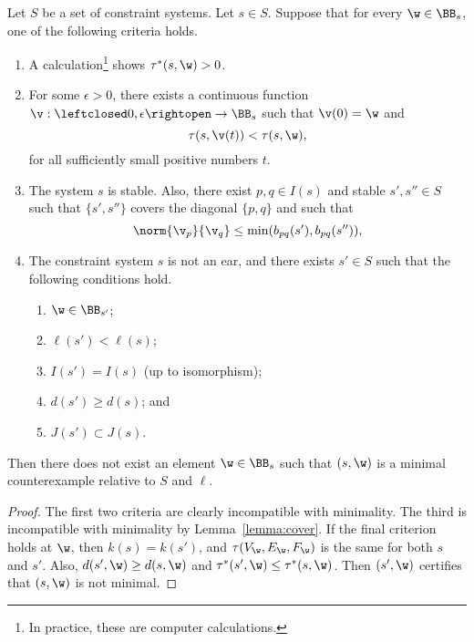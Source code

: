 \begin{lemma}\label{lemma:min-crit} 
Let $S$ be a set of constraint systems.  Let $s\in S$.
Suppose that for every $\w\in\BB_s$, one of the following criteria holds.
\begin{enumerate}
\item {}  A calculation\footnote{In practice, these
  are computer calculations.} shows $\tau^*(s,\w)>0$.
 \item {}  For some $\epsilon>0$, there exists a continuous function 
  $\v:\leftclosed 0,\epsilon\rightopen\to\BB_s$ such that $\v(0)=\w$ and
  \[
  \tau(s,\v(t))<\tau(s,\w),
  \]
  for all sufficiently small positive numbers $t$.
\item {}  The system $s$ is stable.  Also,
there exist $p,q\in I(s)$ and stable $s',s''\in S$ such that
  $\{s',s''\}$ covers the diagonal $\{p,q\}$ and such that
\[
\norm{\v_p}{\v_q}\le \min (b_{pq}(s'),b_{pq}(s'')),
\]
\item {} The constraint system $s$ is not an ear, and
  there exists $s'\in S$ such that the following conditions hold.
  \begin{enumerate}
    \item $\w\in \BB_{s'}$;
    \item $\ell(s')<\ell(s)$;
      \item  $I(s')=I(s)$ (up to isomorphism);
        \item $d(s')\ge d(s)$; and
          \item $J(s')\subset J(s)$.
            \end{enumerate}
\end{enumerate}
Then there does not exist an element $\w\in \BB_s$ such that $(s,\w)$
is a minimal counterexample relative to $S$ and $\ell$.
\end{lemma}
%
%
%

\begin{proof} The first two criteria are clearly incompatible with
  minimality.  The third is incompatible with minimality by
  Lemma~\ref{lemma:cover}.  If the final criterion holds at $\w$, then
  $k(s)=k(s')$, and $\tau(V_\w,E_\w,F_\w)$ is the same for both $s$
  and $s'$.  Also, $d(s',\w)\ge d(s,\w)$ and $\tau^*(s',\w)\le
  \tau^*(s,\w)$.  Then $(s',\w)$ certifies that $(s,\w)$ is not minimal.
\end{proof}

